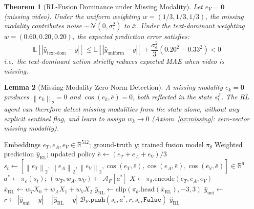 \documentclass[12pt,a4paper]{article}
\theoremstyle{definition}
\theoremstyle{plain}
\newtheorem{theorem}{Theorem}[section]
\newtheorem{lemma}[theorem]{Lemma}
\theoremstyle{remark}
\newcommand{\R}{\mathbb{R}}
\newcommand{\Norm}[1]{\left\|#1\right\|_2}
\newcommand{\EE}{\mathbb{E}}
\begin{document}
\begin{theorem}[RL-Fusion Dominance under Missing Modality]
\label{thm:fusion_dom}
Let $e_V = \mathbf{0}$ (missing video). Under the uniform weighting
$w=(1/3,1/3,1/3)$, the missing modality contributes noise
$\sim \mathcal{N}(0,\sigma_\epsilon^2)$ to $\bar{x}$. Under the text-dominant
weighting $w=(0.60,0.20,0.20)$, the expected prediction error satisfies:
\[
  \EE[|\hat{y}_{\text{text-dom}} - y|]
  \le \EE[|\hat{y}_{\text{uniform}} - y|]
  + \frac{\sigma_\epsilon^2}{3}\left(0.20^2 - 0.33^2\right) < 0
\]
i.e.\ the text-dominant action strictly reduces expected MAE when video is missing.
\end{theorem}

\begin{lemma}[Missing-Modality Zero-Norm Detection]
\label{lem:zero_norm}
A missing modality $e_k = \mathbf{0}$ produces $\Norm{e_k} = 0$ and
$\cos(e_k,\bar{e}) = 0$, both reflected in the state $s_t^F$.
The RL agent can therefore detect missing modalities from the state alone,
without any explicit sentinel flag, and learn to assign $w_k \to 0$
(Axiom~\ref{ax:missing}: zero-vector missing modality).
\end{lemma}

\begin{algorithm}[H]
\caption{RL-Fusion Policy --- Weighted Prediction and Feedback}
\label{alg:rl_fusion}
\begin{algorithmic}[1]
\Require Embeddings $e_T, e_A, e_V \in \R^{512}$; ground-truth $y$;
         trained fusion model $\pi_\theta$
\Ensure Weighted prediction $\hat{y}_{\text{RL}}$; updated policy
\State $\bar{e} \gets (e_T + e_A + e_V)/3$
\State $s_t \gets [\Norm{e_T},\Norm{e_A},\Norm{e_V},
       \cos(e_T,\bar{e}),\cos(e_A,\bar{e}),\cos(e_V,\bar{e})] \in \R^6$
\State $a^* \gets \pi_\varepsilon(s_t)$;
       \quad $(w_T,w_A,w_V) \gets \mathcal{A}_F[a^*]$
\State $X \gets \pi_\theta.\text{encode}(e_T,e_A,e_V)$
\State $\bar{x}_{\text{RL}} \gets w_T X_0 + w_A X_1 + w_V X_2$
\State $\hat{y}_{\text{RL}} \gets \text{clip}(\pi_\theta.\text{head}(\bar{x}_{\text{RL}}),{-3},{3})$
\State $\hat{y}_{\text{uni}} \gets$ 
\State $r \gets |\hat{y}_{\text{uni}}-y| - |\hat{y}_{\text{RL}}-y|$
\State $\mathcal{B}_F.\texttt{push}(s_t,a^*,r,s_t,\texttt{False})$
\State {}
\State \Return $\hat{y}_{\text{RL}}$
\end{algorithmic}
\end{algorithm}
\end{document}

